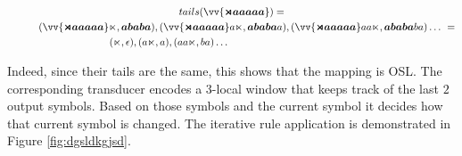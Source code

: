 \begin{multline*}
tails(\vv{\bm{\bow aaaaa}}) = \\
\qquad \shoveleft{(\vv{\bm{\bow aaaaa}}\eow, \bm{ababa}), (\vv{\bm{\bow aaaaa}}a\eow, \bm{ababa}a), (\vv{\bm{\bow aaaaa}}aa\eow, \bm{ababa}ba) \dots~ =}  \\
 \qquad\qquad\qquad\qquad\quad \shoveleft{(\eow, \epsilon), (a\eow, a), (aa\eow, ba) \dots}
\end{multline*}

Indeed, since their tails are the same, this shows that the mapping is OSL.
The corresponding transducer encodes a $3$-local window that keeps track of the last $2$ output symbols.
Based on those symbols and the current symbol it decides how that current symbol is changed.
The iterative rule application is demonstrated in Figure \ref{fig:dgsldkgjsd}.



